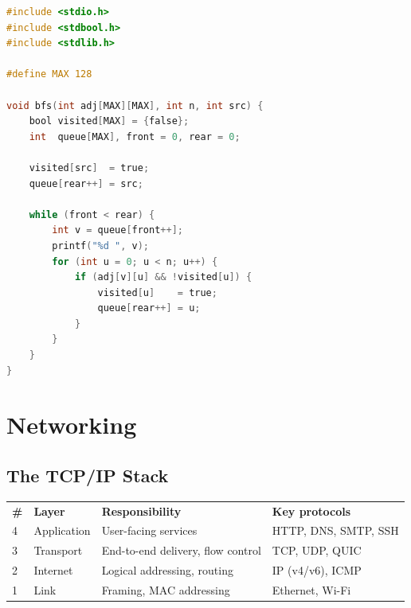 \documentclass[12pt,a4paper]{article}
\begin{document}
\begin{tcolorbox}[codebox, title=BFS — C]
\begin{lstlisting}[language=C]
#include <stdio.h>
#include <stdbool.h>
#include <stdlib.h>

#define MAX 128

void bfs(int adj[MAX][MAX], int n, int src) {
    bool visited[MAX] = {false};
    int  queue[MAX], front = 0, rear = 0;

    visited[src]  = true;
    queue[rear++] = src;

    while (front < rear) {
        int v = queue[front++];
        printf("%d ", v);
        for (int u = 0; u < n; u++) {
            if (adj[v][u] && !visited[u]) {
                visited[u]    = true;
                queue[rear++] = u;
            }
        }
    }
}
\end{lstlisting}
\end{tcolorbox}

\section{Networking}

\subsection{The TCP/IP Stack}

\begin{center}
\begin{tabularx}{\linewidth}{C{0.4cm} L{2.6cm} X L{3.8cm}}
  \color{white}\textbf{\#} &
  \color{white}\textbf{Layer} &
  \color{white}\textbf{Responsibility} &
  \color{white}\textbf{Key protocols} \\
  4 & Application  & User-facing services             & HTTP, DNS, SMTP, SSH \\
  3 & Transport    & End-to-end delivery, flow control & TCP, UDP, QUIC \\
  2 & Internet     & Logical addressing, routing       & IP (v4/v6), ICMP \\
  1 & Link         & Framing, MAC addressing           & Ethernet, Wi-Fi \\
\end{tabularx}
\end{center}
\end{document}
